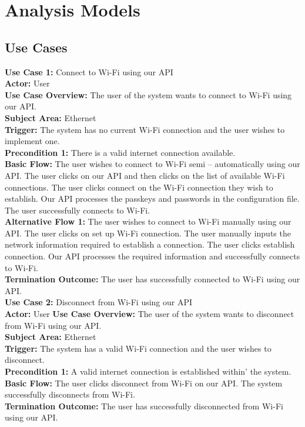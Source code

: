 \section{Analysis Models}
\subsection{Use Cases}

\textbf{Use Case 1:} Connect to Wi-Fi using our API\\ 
\textbf{Actor:} User\\
\textbf{Use Case Overview:} The user of the system wants to connect to Wi-Fi using our API.\\
\textbf{Subject Area:} Ethernet\\
\textbf{Trigger:} The system has no current Wi-Fi connection and the user wishes to implement one.\\
\textbf{Precondition 1:} There is a valid internet connection available.\\
\textbf{Basic Flow:} The user wishes to connect to Wi-Fi semi – automatically using our API. The user clicks 
on our API and then clicks on the list of available Wi-Fi connections. The user clicks connect on the 
Wi-Fi connection they wish to establish. Our API processes the passkeys and passwords in the configuration 
file. The user successfully connects to Wi-Fi.\\
\textbf{Alternative Flow 1:} The user wishes to connect to Wi-Fi manually using our API. The user clicks on set up Wi-Fi 
connection. The user manually inputs the network information required to establish a connection. The user clicks 
establish connection. Our API processes the required information and successfully connects to Wi-Fi.\\
\textbf{Termination Outcome:} The user has successfully connected to Wi-Fi using our API.\\

\textbf{Use Case 2:} Disconnect from Wi-Fi using our API\\
\textbf{Actor:} User
\textbf{Use Case Overview:} The user of the system wants to disconnect from Wi-Fi using our API.\\
\textbf{Subject Area:} Ethernet\\
\textbf{Trigger:} The system has a valid Wi-Fi connection and the user wishes to disconnect.\\
\textbf{Precondition 1:} A valid internet connection is established within’ the system.\\
\textbf{Basic Flow:} The user clicks disconnect from Wi-Fi on our API. The system successfully disconnects from Wi-Fi.\\
\textbf{Termination Outcome:} The user has successfully disconnected from Wi-Fi using our API.\\
